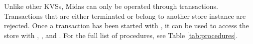 Unlike other \acp{KVS}, Midas can only be operated through transactions. Transactions that are either terminated or belong to another store instance are rejected. Once a transaction has been started with , it can be used to access the store with , , and . For the full list of procedures, see Table \ref{tab:procedures}.



